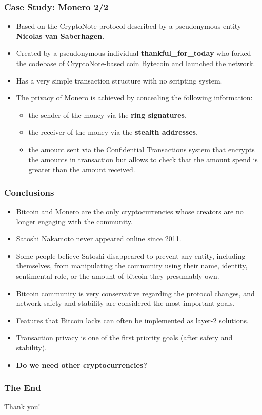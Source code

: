 \documentclass{beamer}
\begin{document}
\begin{frame}
  \frametitle{Case Study: Monero 2/2}
  \begin{itemize}
  \item Based on the CryptoNote protocol described by a pseudonymous entity
    \textbf{Nicolas van Saberhagen}.
  \item Created by a pseudonymous individual \textbf{thankful\_for\_today} who
    forked the codebase of CryptoNote-based coin Bytecoin and launched the
    network.
  \item Has a very simple transaction structure with no scripting system.
  \item The privacy of Monero is achieved by concealing the following
    information:
    \begin{itemize}
    \item the sender of the money via the \textbf{ring signatures},
    \item the receiver of the money via the \textbf{stealth addresses},
    \item the amount sent via the Confidential Transactions system that encrypts
      the amounts in transaction but allows to check that the amount spend is
      greater than the amount received.
    \end{itemize}
  \end{itemize}
\end{frame}

\begin{frame}
  \frametitle{Conclusions}
  \begin{itemize}
  \item Bitcoin and Monero are the only cryptocurrencies whose creators are no
    longer engaging with the community.
  \item Satoshi Nakamoto never appeared online since 2011.
  \item Some people believe Satoshi disappeared to prevent any entity, including
    themselves, from manipulating the community using their name, identity,
    sentimental role, or the amount of bitcoin they presumably own.
  \item Bitcoin community is very conservative regarding the protocol changes,
    and network safety and stability are considered the most important goals.
  \item Features that Bitcoin lacks can often be implemented as layer-2
    solutions.
  \item Transaction privacy is one of the first priority goals (after safety and
    stability).
  \item \textbf{Do we need other cryptocurrencies?}
  \end{itemize}
\end{frame}

\begin{frame}
  \frametitle{The End}
  \begin{center}
    Thank you!
  \end{center}
\end{frame}
\end{document}
